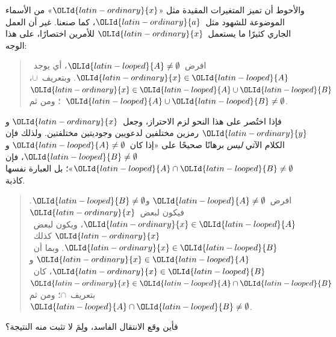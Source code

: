 \documentclass[../../../include/open-logic-section]{subfiles}
\begin{document}
والأحوط أن تميز المتغيرات المقيدة مثل «$\OLId{latin-ordinary}{x}$» من الأسماء الموضوعة
للشهود مثل~$\OLId{latin-ordinary}{a}$، كما صنعنا. غير أن العمل الجاري كثيرًا ما يستعمل~$\OLId{latin-ordinary}{x}$
للأمرين اختصارًا، على هذا الوجه:
\begin{quote}
افرض~$\OLId{latin-looped}{A} \neq \emptyset$، أي يوجد~$\OLId{latin-ordinary}{x} \in \OLId{latin-looped}{A}$. وبتعريف~$\cup$،
$\OLId{latin-ordinary}{x} \in \OLId{latin-looped}{A} \cup \OLId{latin-looped}{B}$؛ ومن ثم~$\OLId{latin-looped}{A} \cup \OLId{latin-looped}{B} \neq \emptyset$.
\end{quote}
فإذا اختُصر على هذا النحو لزم الاحتراز، وجعل~$\OLId{latin-ordinary}{x}$ و$\OLId{latin-ordinary}{y}$ رمزين مختلفين
لدعويين وجوديتين مختلفتين. ولذلك فإن الكلام الآتي \emph{ليس} برهانًا
صحيحًا على «إذا كان~$\OLId{latin-looped}{A} \neq \emptyset$ و$\OLId{latin-looped}{B} \neq \emptyset$، فإن
$\OLId{latin-looped}{A} \cap \OLId{latin-looped}{B} \neq \emptyset$»؛ بل العبارة نفسها كاذبة.
\begin{quote}
افرض~$\OLId{latin-looped}{A} \neq \emptyset$ و$\OLId{latin-looped}{B} \neq \emptyset$. فيكون لبعض~$\OLId{latin-ordinary}{x}$
$\OLId{latin-ordinary}{x} \in \OLId{latin-looped}{A}$، ويكون لبعض~$\OLId{latin-ordinary}{x}$ كذلك~$\OLId{latin-ordinary}{x} \in \OLId{latin-looped}{B}$. وبما أن~$\OLId{latin-ordinary}{x} \in \OLId{latin-looped}{A}$ و
$\OLId{latin-ordinary}{x} \in \OLId{latin-looped}{B}$، كان~$\OLId{latin-ordinary}{x} \in \OLId{latin-looped}{A} \cap \OLId{latin-looped}{B}$ بتعريف~$\cap$؛ ومن ثم
$\OLId{latin-looped}{A} \cap \OLId{latin-looped}{B} \neq \emptyset$.
\end{quote}
فأين وقع الانتقال الفاسد، ولِمَ لا تثبت منه النتيجة؟
\end{document}
